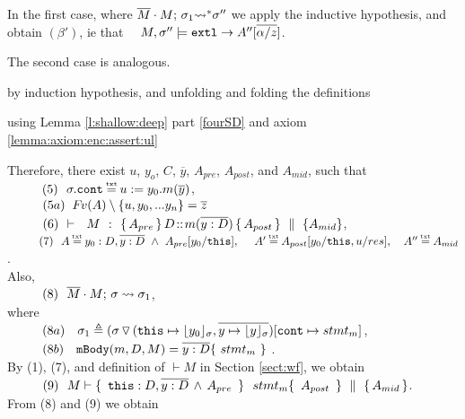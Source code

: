 \begin{description}
In the first case, where $\overline{M}\cdot M;\, {\sigma_1} {\rightsquigarrow^*} \sigma''$ we apply the inductive hypothesis, and obtain $(\beta')$, ie that \ \ $ M, \sigma'' \models \mbox{\normalfont{\texttt{extl}}} \rightarrow A''[\overline{\alpha/z}]$.

 The second case is analogous.
 
  \item[{\sc{combine}}]  by induction hypothesis, and unfolding and folding the definitions
  
 \item[{\sc{consequ}}]  using Lemma \ref{l:shallow:deep} part \ref{fourSD}  and axiom \ref{lemma:axiom:enc:assert:ul}

%
%
\item[{\sc{Call\_Int}}]
 
 Therefore, there exist $u$, $y_o$, $C$, $\overline y$,  $A_{pre}$, $A_{post}$, and $A_{mid}$, such that \\
 $\SPS (5) \ \ \sigma.\prg{cont}\txteq u:=y_0.m(\overline y)$,\\
   $\strut \ \ \hspace{0.5cm} \ \  (5a) \ \ {\hspace{-1pt}F\hspace{-1pt}}v(A)\setminus \{ u, y_0, ... y_n \}  =\overline z $
\\ 
$\strut \ \ \hspace{0.5cm} \ \  (6) \  \ {\vdash \ \ M\ \ \mathbf{:}\ \  \{\, A_{pre}\, \}\, D\!::\!m(\overline{y:D})\, \{\, A_{post}\, \} \, \,\parallel\,\, \{ A_{mid} \}}$, \\
$\SPS (7) \  \ A \txteq y_0:D ,\overline {y:D}\ \wedge \  A_{pre}[y_0/\prg{this}],\ \  \ \ 
A'  \txteq A_{post}[y_0/\prg{this},u/res],\ \ \ 
A'' \txteq  A_{mid}$. 
\\
Also, \\
$\strut \ \ \hspace{0.5cm} \ \  (8) \ \ \overline{M}\cdot M;\, {\sigma} \rightsquigarrow \sigma_1$, \\
 where \\
$\strut \ \ \hspace{0.5cm} \ \  (8a) \ \ \ \sigma_1\triangleq ( \sigma \, {\triangledown}\,  (\mbox{\normalfont{\texttt{this}}}\mapsto {\lfloor y_0 \rfloor_{\sigma}},{\overline{y \mapsto {\lfloor y \rfloor_{\sigma}}}}) [\mbox{\normalfont{\texttt{cont}}}\mapsto stmt_m]$, \\%
$\strut \ \ \hspace{0.5cm} \ \  (8b) \ \ \   \mbox{\normalfont{\texttt{mBody}}}(m,D,M)=\overline{y:D}\{\    stmt_m\ \}$ .\\
By (1), (7), and definition of $\vdash M$ in Section \ref{sect:wf}, we obtain\\
$\strut \ \ \hspace{0.5cm} \ \  (9) \ \ M \vdash   \{\,  \ \mbox{\normalfont{\texttt{this}}}:D,\overline{y:D}\, \wedge\, A_{pre}\   \, \}\ \ stmt_m  \{\, \ A_{post}\  \, \} \, \,\parallel\,\, \{\, A_{mid} \, \} $.\\
From (8) and (9) we obtain  \\

\end{description}
